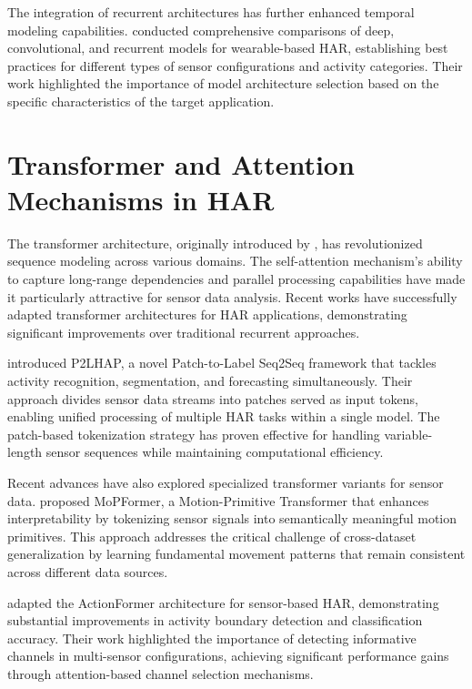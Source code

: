 The integration of recurrent architectures has further enhanced temporal modeling capabilities. \cite{Hammerla2016Deep} conducted comprehensive comparisons of deep, convolutional, and recurrent models for wearable-based HAR, establishing best practices for different types of sensor configurations and activity categories. Their work highlighted the importance of model architecture selection based on the specific characteristics of the target application.

\section{Transformer and Attention Mechanisms in HAR}

\hspace{2em}The transformer architecture, originally introduced by \cite{Vaswani2017Attention}, has revolutionized sequence modeling across various domains. The self-attention mechanism's ability to capture long-range dependencies and parallel processing capabilities have made it particularly attractive for sensor data analysis. Recent works have successfully adapted transformer architectures for HAR applications, demonstrating significant improvements over traditional recurrent approaches.

\cite{Li2024P2LHAP} introduced P2LHAP, a novel Patch-to-Label Seq2Seq framework that tackles activity recognition, segmentation, and forecasting simultaneously. Their approach divides sensor data streams into patches served as input tokens, enabling unified processing of multiple HAR tasks within a single model. The patch-based tokenization strategy has proven effective for handling variable-length sensor sequences while maintaining computational efficiency.

Recent advances have also explored specialized transformer variants for sensor data. \cite{Zhang2025MoPFormer} proposed MoPFormer, a Motion-Primitive Transformer that enhances interpretability by tokenizing sensor signals into semantically meaningful motion primitives. This approach addresses the critical challenge of cross-dataset generalization by learning fundamental movement patterns that remain consistent across different data sources.

\cite{Zhao2025ActionFormer} adapted the ActionFormer architecture for sensor-based HAR, demonstrating substantial improvements in activity boundary detection and classification accuracy. Their work highlighted the importance of detecting informative channels in multi-sensor configurations, achieving significant performance gains through attention-based channel selection mechanisms.

